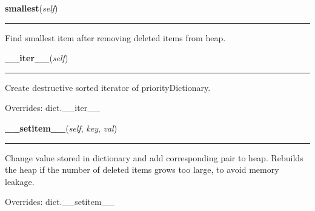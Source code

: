     \label{Epigrass:simobj:priorityDictionary:smallest}

    \vspace{0.5ex}

    \begin{boxedminipage}{\textwidth}

    \raggedright \textbf{smallest}(\textit{self})

    \vspace{-1.5ex}

    \rule{\textwidth}{0.5\fboxrule}
    Find smallest item after removing deleted items from heap.

    \vspace{1ex}

    \end{boxedminipage}

    \vspace{0.5ex}

    \begin{boxedminipage}{\textwidth}

    \raggedright \textbf{\_\_iter\_\_}(\textit{self})

    \vspace{-1.5ex}

    \rule{\textwidth}{0.5\fboxrule}
    Create destructive sorted iterator of priorityDictionary.

    \vspace{1ex}

      Overrides: dict.\_\_iter\_\_

    \end{boxedminipage}

    \vspace{0.5ex}

    \begin{boxedminipage}{\textwidth}

    \raggedright \textbf{\_\_setitem\_\_}(\textit{self}, \textit{key}, \textit{val})

    \vspace{-1.5ex}

    \rule{\textwidth}{0.5\fboxrule}
    Change value stored in dictionary and add corresponding pair to heap.  
    Rebuilds the heap if the number of deleted items grows too large, to 
    avoid memory leakage.

    \vspace{1ex}

      Overrides: dict.\_\_setitem\_\_

    \end{boxedminipage}

